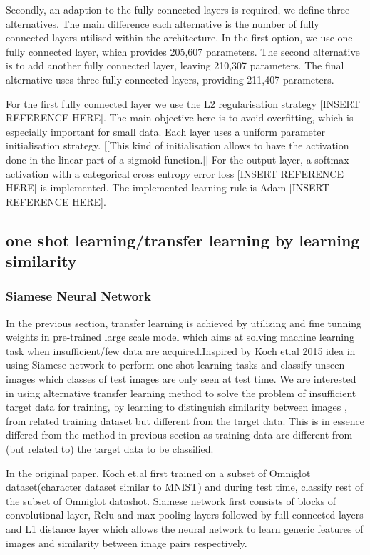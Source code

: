 \documentclass{article}
\begin{document}
Secondly, an adaption to the fully connected layers is required, we define three alternatives. The main difference each alternative is the number of fully connected layers utilised within the architecture. In the first option, we use one fully connected layer, which provides 205,607 parameters. The second alternative is to add another fully connected layer, leaving 210,307 parameters. The final alternative uses three fully connected layers, providing 211,407 parameters.

For the first fully connected layer we use the L2 regularisation strategy [INSERT REFERENCE HERE]. The main objective here is to avoid overfitting, which is especially important for small data. Each layer uses a uniform parameter initialisation strategy. [[This kind of initialisation allows to have the activation done in the linear part of a sigmoid function.]] For the output layer, a softmax activation with a categorical cross entropy error loss [INSERT REFERENCE HERE] is implemented. The implemented learning rule is Adam [INSERT REFERENCE HERE].

\subsection{one shot learning/transfer learning by learning similarity}
\label{sec:oneshot}

\subsubsection{\textbf{Siamese Neural Network}}
In the previous section, transfer learning is achieved by utilizing and fine tunning weights in pre-trained large scale model which aims 
at solving machine learning task when insufficient/few data are acquired.Inspired by Koch et.al 2015 idea in using Siamese network to 
perform one-shot learning tasks and classify unseen images which classes of test images are only seen at test time. We are interested in
using alternative transfer learning method to solve the problem of insufficient target data for training, by learning to distinguish 
similarity between images , from related training dataset but different from the target data. This is in essence differed from the 
method in previous section as training data are different from (but related to) the target data to be classified. 

In the original paper, Koch et.al first trained on a subset of Omniglot dataset(character dataset similar to MNIST) and during test 
time, classify rest of the subset of Omniglot datashot. Siamese network first consists of blocks of convolutional layer, Relu and max 
pooling layers followed by full connected layers and L1 distance layer which allows the neural network to learn generic features of 
images and similarity between image pairs respectively. 
\end{document}

